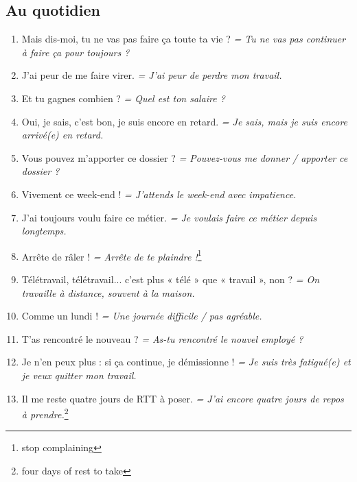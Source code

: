 \documentclass[math,code]{amznotes}
\theoremstyle{remark}
\begin{document}
\subsection*{Au quotidien}

\begin{enumerate}
    \item Mais dis-moi, tu ne vas pas faire ça toute ta vie ? \textit{= Tu ne vas pas continuer à faire ça pour toujours ?}
    
    \item J'ai peur de me faire virer. \textit{= J'ai peur de perdre mon travail.}
    
    \item Et tu gagnes combien ? \textit{= Quel est ton salaire ?}
    
    \item Oui, je sais, c'est bon, je suis encore en retard. \textit{= Je sais, mais je suis encore arrivé(e) en retard.}
    
    \item Vous pouvez m'apporter ce dossier ? \textit{= Pouvez-vous me donner / apporter ce dossier ?}
    
    \item Vivement ce week-end ! \textit{= J'attends le week-end avec impatience.}
    
    \item J'ai toujours voulu faire ce métier. \textit{= Je voulais faire ce métier depuis longtemps.}
    
    \item Arrête de râler ! \textit{= Arrête de te plaindre !}\footnote{stop complaining}
    
    \item Télétravail, télétravail... c'est plus « télé » que « travail », non ? \textit{= On travaille à distance, souvent à la maison.}
    
    \item Comme un lundi ! \textit{= Une journée difficile / pas agréable.}
    
    \item T'as rencontré le nouveau ? \textit{= As-tu rencontré le nouvel employé ?}
    
    \item Je n'en peux plus : si ça continue, je démissionne ! \textit{= Je suis très fatigué(e) et je veux quitter mon travail.}
    
    \item Il me reste quatre jours de RTT à poser. \textit{= J'ai encore quatre jours de repos à prendre.}\footnote{four days of rest to take}
\end{enumerate}
\end{document}
